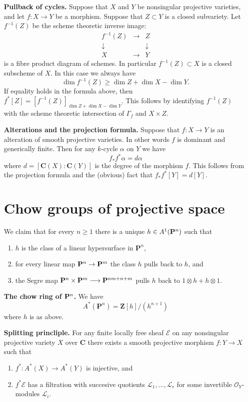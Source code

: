 \medskip\noindent
{\bf Pullback of cycles.} Suppose that $X$ and $Y$ be nonsingular
projective varieties, and let $f : X \to Y$ be a morphism. 
Suppose that $Z \subset Y$ is a closed subvariety. Let $f^{-1}(Z)$
be the scheme theoretic inverse image:
$$
\begin{matrix}
f^{-1}(Z) & \rightarrow & Z \\
\downarrow & & \downarrow \\
X & \rightarrow & Y
\end{matrix}
$$
is a fibre product diagram of schemes. In particular $f^{-1}(Z) \subset X$
is a closed subscheme of $X$. In this case we always have
$$
\dim f^{-1}(Z) \geq \dim Z + \dim X - \dim Y.
$$
If equality holds in the formula above, then
$f^*[Z] = [f^{-1}(Z)]_{\dim Z + \dim X - \dim Y}$.
This follows by identifying $f^{-1}(Z)$ with the
scheme theoretic intersection of $\Gamma_f$ and $X\times Z$.


\medskip\noindent
{\bf Alterations and the projection formula.}
Suppose that $f : X \to Y$ is an alteration of smooth projective
varieties. In other words $f$ is dominant and generically finite.
Then for any $k$-cycle $\alpha$ on $Y$ we have
$$
f_*f^*\alpha = d\alpha
$$
where $d = [\mathbf{C}(X) : \mathbf{C}(Y)]$ is the degree of the
morphism $f$. This follows from the projection formula and the
(obvious) fact that $f_*f^*[Y] = d[Y]$.


\section{Chow groups of projective space}
\label{section-chow-projective}

\noindent
We claim that for every $n \geq 1$
there is a unique $h \in A^1({\bf P}^n)$ such that
\begin{enumerate}
\item $h$ is the class of a linear hypersurface in $\mathbf{P}^n$,
\item
for every linear map ${\bf P}^n \to {\bf P}^m$
the class $h$ pulls back to $h$, and
\item
the Segre map 
$
{\bf P}^n \times {\bf P}^m 
\longrightarrow
{\bf P}^{nm+n+m}
$
pulls $h$ back to $1\otimes h + h \otimes 1$.
\end{enumerate}

\medskip\noindent
{\bf The chow ring of ${\bf P}^n$.}
We have
$$
A^*(\mathbf{P}^n) = 
\mathbf{Z}[h]/(h^{n+1})
$$
where $h$ is as above.




\medskip\noindent
{\bf Splitting princliple.} 
For any finite locally free sheaf ${\mathcal E}$ on any nonsingular projective
variety $X$ over $\mathbf{C}$ there exists a smooth projective morphism
$f : Y \to X$ such that
\begin{enumerate}
\item $f^* : A^*(X) \to A^*(Y)$ is injective, and
\item $f^*{\mathcal E}$ has a filtration
with succesive quotients ${\mathcal L}_1, \ldots, {\mathcal L}_r$
for some invertible ${\mathcal O}_Y$-modules ${\mathcal L}_i$.
\end{enumerate}

